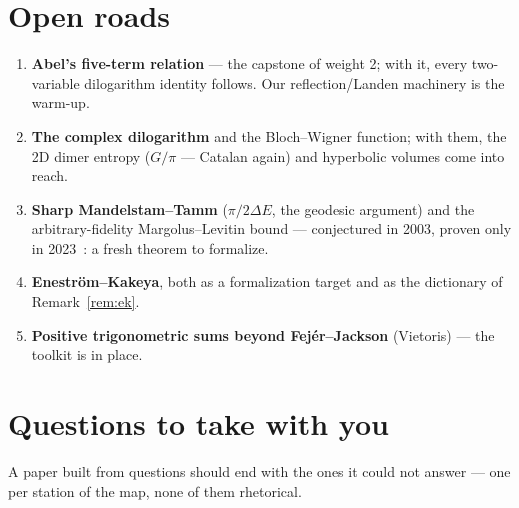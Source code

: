 \documentclass[11pt]{article}
\begin{document}
\section{Open roads}\label{sec:roads}

\begin{enumerate}
\item \textbf{Abel's five-term relation} --- the capstone of weight 2; with it, every
two-variable dilogarithm identity follows. Our reflection/Landen machinery is the
warm-up.
\item \textbf{The complex dilogarithm} and the Bloch--Wigner function; with them, the
2D dimer entropy ($G/\pi$ --- Catalan again) and hyperbolic volumes come into reach.
\item \textbf{Sharp Mandelstam--Tamm} ($\pi/2\Delta E$, the geodesic argument) and the
arbitrary-fidelity Margolus--Levitin bound --- conjectured in 2003, proven only in
2023~\cite{hornedal}: a fresh theorem to formalize.
\item \textbf{Enestr\"om--Kakeya}, both as a formalization target and as the dictionary
of Remark~\ref{rem:ek}.
\item \textbf{Positive trigonometric sums beyond Fej\'er--Jackson} (Vietoris) --- the
toolkit is in place.
\end{enumerate}

\section*{Questions to take with you}

A paper built from questions should end with the ones it could not answer --- one per
station of the map, none of them rhetorical.
\end{document}
